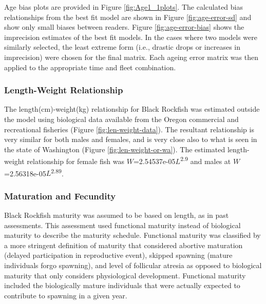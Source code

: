 \documentclass[11pt,
  english,
  letterpaper,
]{article}
\begin{document}
Age bias plots are provided in Figure \ref{fig:Age1_1plots}. The calculated bias relationships from the best fit model are shown in Figure \ref{fig:age-error-sd} and show only small biases between readers. Figure \ref{fig:age-error-bias} shows the imprecision estimates of the best fit models. In the cases where two models were similarly selected, the least extreme form (i.e., drastic drops or increases in imprecision) were chosen for the final matrix. Each ageing error matrix was then applied to the appropriate time and fleet combination.

\hypertarget{length-weight-relationship}{%
\subsubsection{Length-Weight Relationship}\label{length-weight-relationship}}

The length(cm)-weight(kg) relationship for Black Rockfish was estimated outside the model using biological data available from the Oregon commercial and recreational fisheries (Figure \ref{fig:len-weight-data}). The resultant relationship is very similar for both males and females, and is very close also to what is seen in the state of Washington (Figure \ref{fig:len-weight-or-wa}). The estimated length-weight relationship for female fish was \(W\)=2.54537e-05\(L\)\textsuperscript{2.9} and males at \(W\)=2.56318e-05\(L\)\textsuperscript{2.89}.

\hypertarget{maturation-and-fecundity}{%
\subsubsection{Maturation and Fecundity}\label{maturation-and-fecundity}}

Black Rockfish maturity was assumed to be based on length, as in past assessments. This assessment used functional maturity instead of biological maturity to describe the maturity schedule. Functional maturity was classified by a more stringent definition of maturity that considered abortive maturation (delayed participation in reproductive event), skipped spawning (mature individuals forgo spawning), and level of follicular atresia as opposed to biological maturity that only considers physiological development. Functional maturity included the biologically mature individuals that were actually expected to contribute to spawning in a given year.
\end{document}
